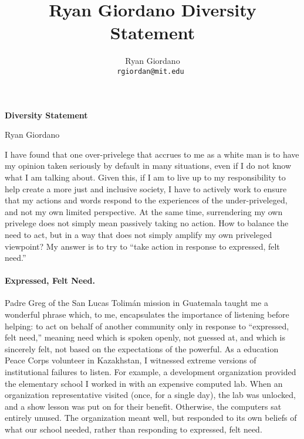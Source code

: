 
\usepackage{enumitem}

\usepackage{geometry}
\geometry{top=0.5in}
\geometry{left=1.0in}
\geometry{right=1.0in}


\title{Ryan Giordano Diversity Statement}

\author{
  Ryan Giordano \\ \texttt{rgiordan@mit.edu }
}



\begin{minipage}[t]{0.5\textwidth}
\hspace{-2em} %
{\bf \LARGE Diversity Statement}\\
\end{minipage}
\begin{minipage}[t]{0.5\textwidth}
        \hspace{8em} %
        {\LARGE Ryan Giordano}
\end{minipage}




I have found that one over-privelege that accrues to me as a white man is to
have my opinion taken seriously by default in many situations, even if I do not
know what I am talking about.  Given this, if I am to live up to my
responsibility to help create a more just and inclusive society, I have to
actively work to ensure that my actions and words respond to the experiences of
the under-priveleged, and not my own limited perspective. At the same time,
surrendering my own privelege does not simply mean passively taking no action.
How to balance the need to act, but in a way that does not simply amplify my own
priveleged viewpoint?   My answer is to try to ``take action in response to
expressed, felt need.''


\paragraph{Expressed, Felt Need.}
%
Padre Greg of the San Lucas Tolimán mission in Guatemala taught me a wonderful
phrase which, to me, encapsulates the importance of listening before helping: to
act on behalf of another community only in response to ``expressed, felt need,''
meaning need which is spoken openly, not guessed at, and which is sincerely
felt, not based on the expectations of the powerful.  As a education Peace Corps
volunteer in Kazakhstan, I witnessed extreme versions of institutional failures
to listen. For example, a development organization provided the elementary
school I worked in with an expensive computed lab.  When an organization
representative visited (once, for a single day), the lab was unlocked, and a
show lesson was put on for their benefit.  Otherwise, the computers sat entirely
unused. The organization meant well, but responded to its own beliefs of what
our school needed, rather than responding to expressed, felt need.


